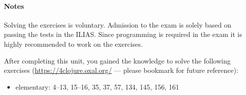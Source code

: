 \documentclass[11pt,a4paper]{article}
\begin{document}
\paragraph{Notes}
Solving the exercises is voluntary.
Admission to the exam is solely based on passing the tests in the ILIAS.
Since programming is required in the exam
it is highly recommended to work on the exercises.

%

\begin{exercise}
    After completing this unit, you gained the knowledge to solve the following exercises (\url{https://4clojure.oxal.org/} --- please bookmark for future reference):

    \begin{itemize}
        \item elementary: 4--13, 15--16, 35, 37, 57, 134, 145, 156, 161
    \end{itemize}
\end{exercise}
\end{document}
